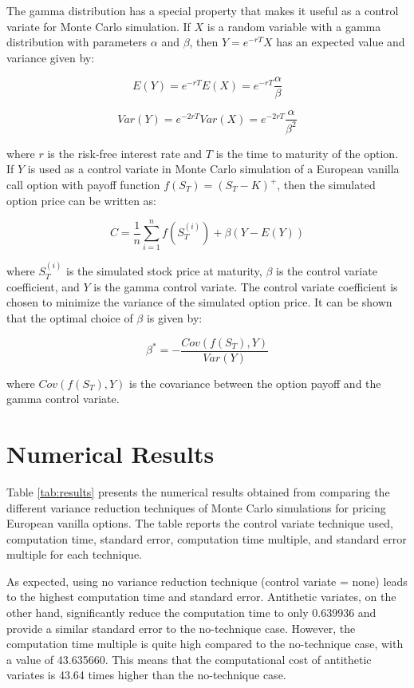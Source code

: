 \documentclass[11pt, a4paper, leqno]{article}
\begin{document}
The gamma distribution has a special property that makes it useful as a control variate for Monte Carlo simulation. If $X$ is a random variable with a gamma distribution with parameters $\alpha$ and $\beta$, then $Y = e^{-rT}X$ has an expected value and variance given by:

\begin{equation}
E(Y) = e^{-rT}E(X) = e^{-rT}\frac{\alpha}{\beta}
\end{equation}

\begin{equation}
Var(Y) = e^{-2rT}Var(X) = e^{-2rT}\frac{\alpha}{\beta^2}
\end{equation}

where $r$ is the risk-free interest rate and $T$ is the time to maturity of the option. If $Y$ is used as a control variate in Monte Carlo simulation of a European vanilla call option with payoff function $f(S_T) = (S_T - K)^+$, then the simulated option price can be written as:

\begin{equation}
C = \frac{1}{n} \sum_{i=1}^{n} f(S_T^{(i)}) + \beta(Y - E(Y))
\end{equation}

where $S_T^{(i)}$ is the simulated stock price at maturity, $\beta$ is the control variate coefficient, and $Y$ is the gamma control variate. The control variate coefficient is chosen to minimize the variance of the simulated option price. It can be shown that the optimal choice of $\beta$ is given by:

\begin{equation}
\beta^* = -\frac{Cov(f(S_T), Y)}{Var(Y)}
\end{equation}

where $Cov(f(S_T), Y)$ is the covariance between the option payoff and the gamma control variate.
\section{Numerical Results}\label{sec:results}

Table \ref{tab:results} presents the numerical results obtained from comparing the different variance reduction techniques of Monte Carlo simulations for pricing European vanilla options. The table reports the control variate technique used, computation time, standard error, computation time multiple, and standard error multiple for each technique.

As expected, using no variance reduction technique (control variate = none) leads to the highest computation time and standard error. Antithetic variates, on the other hand, significantly reduce the computation time to only 0.639936 and provide a similar standard error to the no-technique case. However, the computation time multiple is quite high compared to the no-technique case, with a value of 43.635660. This means that the computational cost of antithetic variates is 43.64 times higher than the no-technique case.
\end{document}
